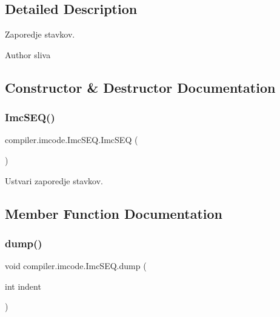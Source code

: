\subsection{Detailed Description}
Zaporedje stavkov.

\begin{DoxyAuthor}{Author}
sliva 
\end{DoxyAuthor}


\subsection{Constructor \& Destructor Documentation}
\mbox{\label{classcompiler_1_1imcode_1_1_imc_s_e_q_a6d58cbc46c3701b6d4866cec298881e2}} 
\subsubsection{\texorpdfstring{Imc\+S\+E\+Q()}{ImcSEQ()}}
{\footnotesize\ttfamily compiler.\+imcode.\+Imc\+S\+E\+Q.\+Imc\+S\+EQ (\begin{DoxyParamCaption}{ }\end{DoxyParamCaption})}

Ustvari zaporedje stavkov. 

\subsection{Member Function Documentation}
\mbox{\label{classcompiler_1_1imcode_1_1_imc_s_e_q_af5e7a76365d325473814eca4544cf8d2}} 
\subsubsection{\texorpdfstring{dump()}{dump()}}
{\footnotesize\ttfamily void compiler.\+imcode.\+Imc\+S\+E\+Q.\+dump (\begin{DoxyParamCaption}\item[{int}]{indent }\end{DoxyParamCaption})}


